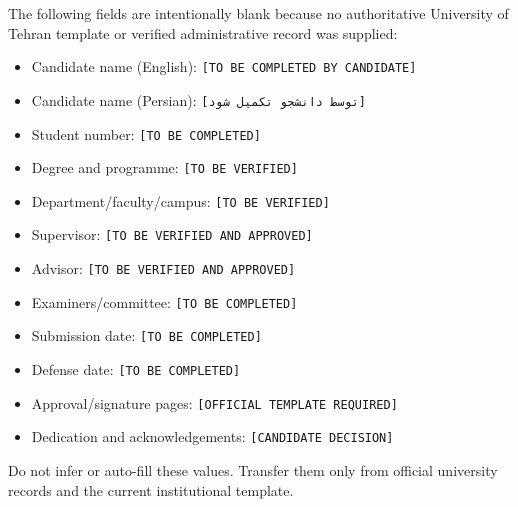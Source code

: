 The following fields are intentionally blank because no authoritative
University of Tehran template or verified administrative record was
supplied:

\begin{itemize}
\tightlist
\item
  Candidate name (English):
  \texttt{{[}TO\ BE\ COMPLETED\ BY\ CANDIDATE{]}}
\item
  Candidate name (Persian): \texttt{{[}توسط\ دانشجو\ تکمیل\ شود{]}}
\item
  Student number: \texttt{{[}TO\ BE\ COMPLETED{]}}
\item
  Degree and programme: \texttt{{[}TO\ BE\ VERIFIED{]}}
\item
  Department/faculty/campus: \texttt{{[}TO\ BE\ VERIFIED{]}}
\item
  Supervisor: \texttt{{[}TO\ BE\ VERIFIED\ AND\ APPROVED{]}}
\item
  Advisor: \texttt{{[}TO\ BE\ VERIFIED\ AND\ APPROVED{]}}
\item
  Examiners/committee: \texttt{{[}TO\ BE\ COMPLETED{]}}
\item
  Submission date: \texttt{{[}TO\ BE\ COMPLETED{]}}
\item
  Defense date: \texttt{{[}TO\ BE\ COMPLETED{]}}
\item
  Approval/signature pages: \texttt{{[}OFFICIAL\ TEMPLATE\ REQUIRED{]}}
\item
  Dedication and acknowledgements: \texttt{{[}CANDIDATE\ DECISION{]}}
\end{itemize}

Do not infer or auto-fill these values. Transfer them only from official
university records and the current institutional template.
